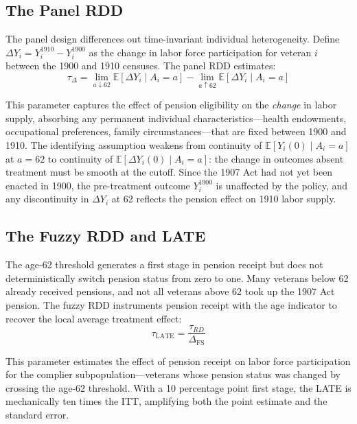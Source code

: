 \documentclass[12pt]{article}
\newcommand{\E}{\mathbb{E}}
\begin{document}
\subsection{The Panel RDD}

The panel design differences out time-invariant individual heterogeneity. Define $\Delta Y_i = Y_i^{1910} - Y_i^{1900}$ as the change in labor force participation for veteran $i$ between the 1900 and 1910 censuses. The panel RDD estimates:
\begin{equation}
\tau_{\Delta} = \lim_{a \downarrow 62} \E[\Delta Y_i \mid A_i = a] - \lim_{a \uparrow 62} \E[\Delta Y_i \mid A_i = a]
\end{equation}

This parameter captures the effect of pension eligibility on the \textit{change} in labor supply, absorbing any permanent individual characteristics---health endowments, occupational preferences, family circumstances---that are fixed between 1900 and 1910. The identifying assumption weakens from continuity of $\E[Y_i(0) \mid A_i = a]$ at $a = 62$ to continuity of $\E[\Delta Y_i(0) \mid A_i = a]$: the change in outcomes absent treatment must be smooth at the cutoff. Since the 1907 Act had not yet been enacted in 1900, the pre-treatment outcome $Y_i^{1900}$ is unaffected by the policy, and any discontinuity in $\Delta Y_i$ at 62 reflects the pension effect on 1910 labor supply.

\subsection{The Fuzzy RDD and LATE}

The age-62 threshold generates a first stage in pension receipt but does not deterministically switch pension status from zero to one. Many veterans below 62 already received pensions, and not all veterans above 62 took up the 1907 Act pension. The fuzzy RDD instruments pension receipt with the age indicator to recover the local average treatment effect:
\begin{equation}
\tau_{\text{LATE}} = \frac{\tau_{RD}}{\Delta_{\text{FS}}}
\end{equation}

This parameter estimates the effect of pension receipt on labor force participation for the complier subpopulation---veterans whose pension status was changed by crossing the age-62 threshold. With a 10 percentage point first stage, the LATE is mechanically ten times the ITT, amplifying both the point estimate and the standard error.
\end{document}
